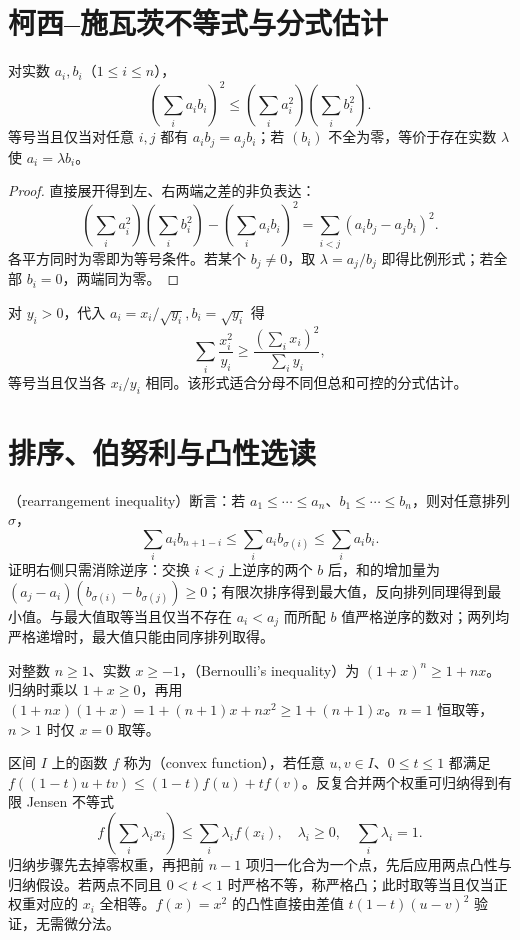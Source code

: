 \documentclass[UTF8]{ctexbook}
\begin{document}
\section{柯西--施瓦茨不等式与分式估计}
\begin{theorem}[柯西--施瓦茨不等式]
对实数 $a_i,b_i$（$1\le i\le n$），
\begin{equation}\label{eq:em-cauchy}
 \left(\sum_i a_ib_i\right)^2\le
 \left(\sum_i a_i^2\right)\left(\sum_i b_i^2\right).
\end{equation}
等号当且仅当对任意 $i,j$ 都有 $a_ib_j=a_jb_i$；若 $(b_i)$ 不全为零，等价于存在实数 $\lambda$ 使 $a_i=\lambda b_i$。
\end{theorem}
\begin{proof}
直接展开得到左、右两端之差的非负表达：
\[
 \left(\sum_i a_i^2\right)\left(\sum_i b_i^2\right)
 -\left(\sum_i a_ib_i\right)^2
 =\sum_{i<j}(a_ib_j-a_jb_i)^2.
\]
各平方同时为零即为等号条件。若某个 $b_j\ne0$，取 $\lambda=a_j/b_j$ 即得比例形式；若全部 $b_i=0$，两端同为零。
\end{proof}
对 $y_i>0$，代入 $a_i=x_i/\sqrt{y_i},b_i=\sqrt{y_i}$ 得
\[
 \sum_i\frac{x_i^2}{y_i}\ge\frac{(\sum_i x_i)^2}{\sum_i y_i},
\]
等号当且仅当各 $x_i/y_i$ 相同。该形式适合分母不同但总和可控的分式估计。

\section{排序、伯努利与凸性选读}
（rearrangement inequality）断言：若 $a_1\le\cdots\le a_n$、$b_1\le\cdots\le b_n$，则对任意排列 $\sigma$，
\[
 \sum_i a_ib_{n+1-i}\le\sum_i a_ib_{\sigma(i)}\le\sum_i a_ib_i.
\]
证明右侧只需消除逆序：交换 $i<j$ 上逆序的两个 $b$ 后，和的增加量为 $(a_j-a_i)(b_{\sigma(i)}-b_{\sigma(j)})\ge0$；有限次排序得到最大值，反向排列同理得到最小值。与最大值取等当且仅当不存在 $a_i<a_j$ 而所配 $b$ 值严格逆序的数对；两列均严格递增时，最大值只能由同序排列取得。

对整数 $n\ge1$、实数 $x\ge-1$，（Bernoulli's inequality）为 $(1+x)^n\ge1+nx$。归纳时乘以 $1+x\ge0$，再用
$(1+nx)(1+x)=1+(n+1)x+nx^2\ge1+(n+1)x$。$n=1$ 恒取等，$n>1$ 时仅 $x=0$ 取等。

区间 $I$ 上的函数 $f$ 称为（convex function），若任意 $u,v\in I$、$0\le t\le1$ 都满足
$f((1-t)u+tv)\le(1-t)f(u)+tf(v)$。反复合并两个权重可归纳得到有限 Jensen 不等式
\[
 f\left(\sum_i\lambda_i x_i\right)\le\sum_i\lambda_i f(x_i),
 \quad \lambda_i\ge0,\quad\sum_i\lambda_i=1.
\]
归纳步骤先去掉零权重，再把前 $n-1$ 项归一化合为一个点，先后应用两点凸性与归纳假设。若两点不同且 $0<t<1$ 时严格不等，称严格凸；此时取等当且仅当正权重对应的 $x_i$ 全相等。$f(x)=x^2$ 的凸性直接由差值 $t(1-t)(u-v)^2$ 验证，无需微分法。
\end{document}
